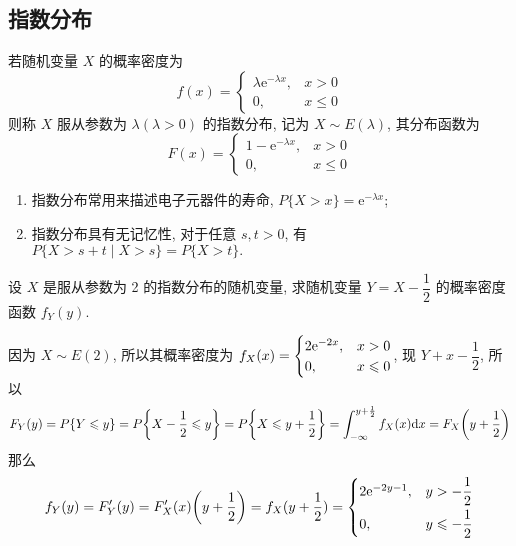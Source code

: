 \subsection{指数分布}

\begin{definition}[指数分布]
    若随机变量 $ X $ 的概率密度为
    $$f(x)=\begin{cases}
            \lambda \mathrm{e}^{-\lambda x}, & x>0           \\
            0,                               & x \leqslant 0
        \end{cases}$$
    则称 $ X $ 服从参数为 $ \lambda(\lambda>0) $ 的指数分布, 记为 $ X \sim E(\lambda) $, 其分布函数为
    $$F(x)=\begin{cases}
            1-\mathrm{e}^{-\lambda x}, & x>0           \\
            0,                         & x \leqslant 0
        \end{cases}$$
    \begin{enumerate}[label=(\arabic{*})]
        \item 指数分布常用来描述电子元器件的寿命, $P\{X>x\}=\mathrm{e}^{-\lambda x} $;
        \item 指数分布具有无记忆性, 对于任意 $ s, t>0$, 有 $P\{X>s+t \mid X>s\}=P\{X>t\} .$
    \end{enumerate}
\end{definition}

\begin{example}
    设 $X$ 是服从参数为 2 的指数分布的随机变量, 求随机变量 $Y=X-\dfrac{1}{2}$ 的概率密度函数 $f_Y(y).$
\end{example}
\begin{solution}
    因为 $X\sim E(2)$, 所以其概率密度为 $f_X(x)=\begin{cases}
            2\mathrm{e}^{-2x}, & x>0          \\
            0,         & x\leqslant 0
        \end{cases}$, 现 $Y+x-\dfrac{1}{2}$, 所以 $$F_Y(y)=P\qty{Y\leqslant y}=P\qty{X-\dfrac{1}{2}\leqslant y}=P\qty{X\leqslant y+\dfrac{1}{2}}=\int_{-\infty}^{y+\frac{1}{2}}f_X(x)\dd x=F_X\qty(y+\dfrac{1}{2})$$
    那么 $$f_Y(y)=F'_Y(y)=F'_X(x)\qty(y+\dfrac{1}{2})=f_X(y+\dfrac{1}{2})=\begin{cases}
            2\mathrm{e}^{-2y-1}, & y>-\dfrac{1}{2}          \\[6pt]
            0,           & y\leqslant -\dfrac{1}{2}
        \end{cases}$$
\end{solution}

